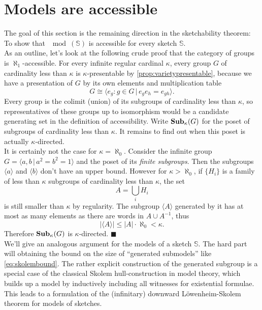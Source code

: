 \section{Models are accessible}
\label{sec:sketchesaccessible}

The goal of this section is the remaining direction in the sketchability theorem: To show that $\mod(\mathbb S)$ is accessible for every sketch $\mathbb S$. \\

As an outline, let's look at the following crude proof that the category of groups is $\aleph_1$-accessible. For every infinite regular cardinal $\kappa$, every group $G$ of cardinality less than $\kappa$ is $\kappa$-presentable by \ref{prop:varietypresentable}, because we have a presentation of $G$ by its own elements and multiplication table
\[ G \cong \langle e_g : g \in G \,|\, e_g e_h = e_{gh} \rangle. \]
Every group is the colimit (union) of its subgroups of cardinality less than $\kappa$, so representatives of these groups up to isomorphism would be a candidate generating set in the definition of accessibility. Write $\mathbf{Sub}_\kappa(G)$ for the poset of subgroups of cardinality less than $\kappa$. It remains to find out when this poset is actually $\kappa$-directed. \\

It is certainly not the case for $\kappa=\aleph_0$. Consider the infinite group $G=\langle a, b \,|\, a^2 = b^2 = 1 \rangle$ and the poset of its \emph{finite subgroups}. Then the subgroups $\langle a \rangle$ and $\langle b \rangle$ don't have an upper bound. 
However for $\kappa > \aleph_0$, if $\{H_i\}$ is a family of less than $\kappa$ subgroups of cardinality less than $\kappa$, the set \[ A = \bigcup_i H_i \]
is still smaller than $\kappa$ by regularity. The subgroup $\langle A \rangle$ generated by it has at most as many elements as there are words in $A \cup A^{-1}$, thus
\begin{equation} |\langle A \rangle| \leq |A|\cdot \aleph_0 < \kappa. \label{eq:skolembound} \end{equation}
Therefore $\mathbf{Sub}_\kappa(G)$ is $\kappa$-directed. $\blacksquare$ \\

We'll give an analogous argument for the models of a sketch $\mathbb S$. The hard part will obtaining the bound on the size of ``generated submodels'' like \eqref{eq:skolembound}. The rather explicit construction of the generated subgroup is a special case of the classical Skolem hull-construction in model theory, which builds up a model by inductively including all witnesses for existential formulae. This leads to a formulation of the (infinitary) downward Löwenheim-Skolem theorem for models of sketches. \\

